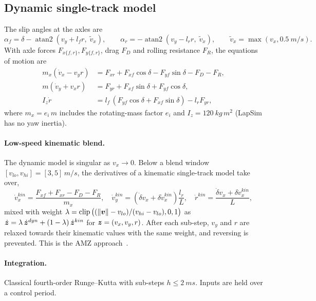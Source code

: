 \documentclass[11pt]{article}
\begin{document}
\subsection{Dynamic single-track model}
The slip angles at the axles are
\begin{equation}
\alpha_f = \delta - \operatorname{atan2}(v_y + l_f r,\; \tilde v_x),\qquad
\alpha_r = -\operatorname{atan2}(v_y - l_r r,\; \tilde v_x),\qquad \tilde v_x = \max(v_x, \SI{0.5}{m/s}).
\end{equation}
With axle forces $F_{x\{f,r\}}, F_{y\{f,r\}}$, drag $F_D$ and rolling resistance $F_R$, the equations of motion
are
\begin{align}
m_x(\dot v_x - v_y r) &= F_{xr} + F_{xf}\cos\delta - F_{yf}\sin\delta - F_D - F_R, \label{eq:vx}\\
m(\dot v_y + v_x r) &= F_{yr} + F_{xf}\sin\delta + F_{yf}\cos\delta,\\
I_z \dot r &= l_f\,(F_{yf}\cos\delta + F_{xf}\sin\delta) - l_r F_{yr},
\end{align}
where $m_x = e_i\,m$ includes the rotating-mass factor $e_i$ and $I_z=\SI{120}{kg\,m^2}$ (LapSim has no yaw
inertia).

\paragraph{Low-speed kinematic blend.} The dynamic model is singular as $v_x\to 0$. Below a blend window
$[v_{lo}, v_{hi}] = [3, 5]\,\si{m/s}$, the derivatives of a kinematic single-track model take over,
\begin{equation}
\dot v_x^{kin} = \frac{F_{xf}+F_{xr}-F_D-F_R}{m_x},\quad
\dot v_y^{kin} = (\dot\delta v_x + \delta \dot v_x^{kin})\frac{l_r}{L},\quad
\dot r^{kin} = \frac{\dot\delta v_x + \delta \dot v_x^{kin}}{L},
\end{equation}
mixed with weight
$\lambda = \operatorname{clip}\big((\lVert\bm{v}\rVert - v_{lo})/(v_{hi}-v_{lo}), 0, 1\big)$ as
$\dot{\bm{z}} = \lambda\,\dot{\bm{z}}^{dyn} + (1-\lambda)\,\dot{\bm{z}}^{kin}$ for $\bm{z} = (v_x, v_y, r)$. After each sub-step, $v_y$ and
$r$ are relaxed towards their kinematic values with the same weight, and reversing is prevented. This is the AMZ
approach~\cite{kabzan2020}.

\paragraph{Integration.} Classical fourth-order Runge--Kutta with sub-steps $h\le\SI{2}{ms}$. Inputs are held over
a control period.
\end{document}
